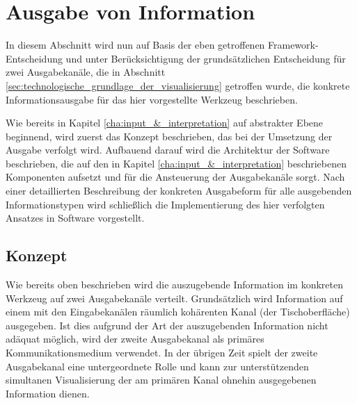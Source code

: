 



\section{Ausgabe von Information} %
\label{sec:ausgabe_von_information}

In diesem Abschnitt wird nun auf Basis der eben getroffenen Framework-Entscheidung und unter Berücksichtigung der grundsätzlichen Entscheidung für zwei Ausgabekanäle, die in Abschnitt \ref{sec:technologische_grundlage_der_visualisierung} getroffen wurde, die konkrete Informationsausgabe für das hier vorgestellte Werkzeug beschrieben.

Wie bereits in Kapitel \ref{cha:input_&_interpretation} auf abstrakter Ebene beginnend, wird zuerst das Konzept beschrieben, das bei der Umsetzung der Ausgabe verfolgt wird. Aufbauend darauf wird die Architektur der Software beschrieben, die auf den in Kapitel \ref{cha:input_&_interpretation} beschriebenen Komponenten aufsetzt und für die Ansteuerung der Ausgabekanäle sorgt. Nach einer detaillierten Beschreibung der konkreten Ausgabeform für alle ausgebenden Informationstypen wird schließlich die Implementierung des hier verfolgten Ansatzes in Software vorgestellt.

\subsection{Konzept} %
\label{sub:ausgabe_konzept}

Wie bereits oben beschrieben wird die auszugebende Information im konkreten Werkzeug auf zwei Ausgabekanäle verteilt. Grundsätzlich wird Information auf einem mit den Eingabekanälen räumlich kohärenten Kanal (der Tischoberfläche) ausgegeben. Ist dies aufgrund der Art der auszugebenden Information nicht adäquat möglich, wird der zweite Ausgabekanal als primäres Kommunikationsmedium verwendet. In der übrigen Zeit spielt der zweite Ausgabekanal eine untergeordnete Rolle und kann zur unterstützenden simultanen Visualisierung der am primären Kanal ohnehin ausgegebenen Information dienen.

